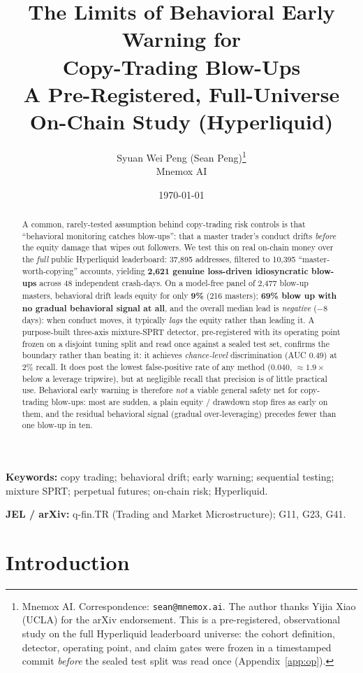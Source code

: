 \documentclass[11pt,a4paper]{article}
\title{\bfseries The Limits of Behavioral Early Warning for\\
Copy-Trading Blow-Ups\\[4pt]
\large A Pre-Registered, Full-Universe On-Chain Study (Hyperliquid)}
\author{Syuan Wei Peng (Sean Peng)\thanks{Mnemox AI. Correspondence:
\texttt{sean@mnemox.ai}. The author thanks Yijia Xiao (UCLA) for the arXiv
endorsement. This is a pre-registered, observational study on the full Hyperliquid
leaderboard universe: the cohort definition, detector, operating point, and claim
gates were frozen in a timestamped commit \emph{before} the sealed test split was
read once (Appendix~\ref{app:op}).}\\
Mnemox AI}
\date{\today}
\begin{document}
\maketitle

\begin{abstract}
A common, rarely-tested assumption behind copy-trading risk controls is that
``behavioral monitoring catches blow-ups'': that a master trader's conduct drifts
\emph{before} the equity damage that wipes out followers. We test this on real
on-chain money over the \emph{full} public Hyperliquid leaderboard: 37{,}895
addresses, filtered to 10{,}395 ``master-worth-copying'' accounts, yielding
\textbf{2{,}621 genuine loss-driven idiosyncratic blow-ups} across 48 independent
crash-days. On a model-free panel of 2{,}477 blow-up masters, behavioral drift
leads equity for only \textbf{9\%} (216 masters); \textbf{69\% blow up with no
gradual behavioral signal at all}, and the overall median lead is \emph{negative}
($-8$ days): when conduct moves, it typically \emph{lags} the equity rather than
leading it. A purpose-built three-axis mixture-SPRT detector, pre-registered with
its operating point frozen on a disjoint tuning split and read once against a
sealed test set, confirms the boundary rather than beating it: it achieves
\emph{chance-level} discrimination (AUC $0.49$) at $2\%$ recall. It does post the
lowest false-positive rate of any method ($0.040$, $\approx\!1.9\times$ below a
leverage tripwire), but at negligible recall that precision is of little practical
use. Behavioral early warning is therefore \emph{not} a viable general safety net
for copy-trading blow-ups: most are sudden, a plain equity / drawdown stop fires
as early on them, and the residual behavioral signal (gradual over-leveraging)
precedes fewer than one blow-up in ten.
\end{abstract}

\medskip
\noindent\textbf{Keywords:} copy trading; behavioral drift; early warning;
sequential testing; mixture SPRT; perpetual futures; on-chain risk; Hyperliquid.

\medskip
\noindent\textbf{JEL / arXiv:} q-fin.TR (Trading and Market Microstructure);
G11, G23, G41.

\section{Introduction}
\label{sec:intro}
\end{document}
